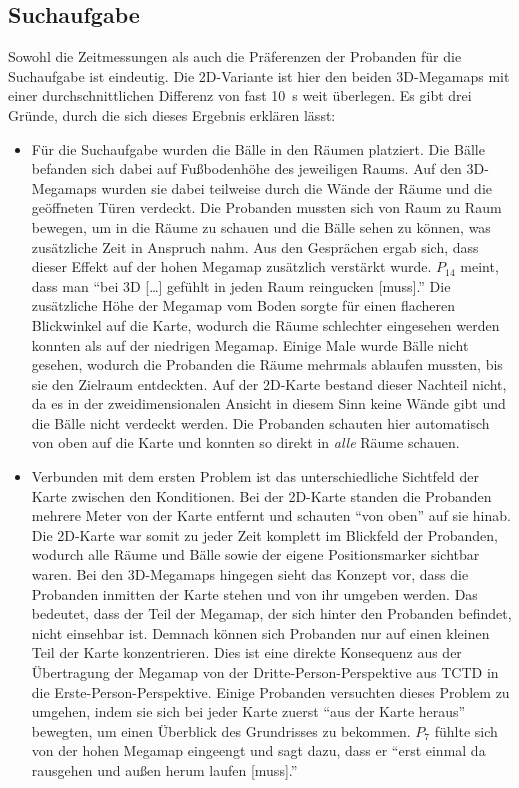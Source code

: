 \subsection{Suchaufgabe}
Sowohl die Zeitmessungen als auch die Präferenzen der Probanden für die Suchaufgabe ist eindeutig.
Die 2D-Variante ist hier den beiden 3D-Megamaps mit einer durchschnittlichen Differenz von fast \SI{10}{\second} weit überlegen.
Es gibt drei Gründe, durch die sich dieses Ergebnis erklären lässt:
\begin{itemize}
    \item
    Für die Suchaufgabe wurden die Bälle in den Räumen platziert.
    Die Bälle befanden sich dabei auf Fußbodenhöhe des jeweiligen Raums.
    Auf den 3D-Megamaps wurden sie dabei teilweise durch die Wände der Räume und die geöffneten Türen verdeckt.
    Die Probanden mussten sich von Raum zu Raum bewegen, um in die Räume zu schauen und die Bälle sehen zu können, was zusätzliche Zeit in Anspruch nahm.
    Aus den Gesprächen ergab sich, dass dieser Effekt auf der hohen Megamap zusätzlich verstärkt wurde.
    $P_{14}$ meint, dass man \enquote{bei 3D [\dots] gefühlt in jeden Raum reingucken [muss].}
    Die zusätzliche Höhe der Megamap vom Boden sorgte für einen flacheren Blickwinkel auf die Karte, wodurch die Räume schlechter eingesehen werden konnten als auf der niedrigen Megamap.
    Einige Male wurde Bälle nicht gesehen, wodurch die Probanden die Räume mehrmals ablaufen mussten, bis sie den Zielraum entdeckten.
    Auf der 2D-Karte bestand dieser Nachteil nicht, da es in der zweidimensionalen Ansicht in diesem Sinn keine Wände gibt und die Bälle nicht verdeckt werden.
    Die Probanden schauten hier automatisch von oben auf die Karte und konnten so direkt in \emph{alle} Räume schauen.
    
    \item
    Verbunden mit dem ersten Problem ist das unterschiedliche Sichtfeld der Karte zwischen den Konditionen.
    Bei der 2D-Karte standen die Probanden mehrere Meter von der Karte entfernt und schauten \enquote{von oben} auf sie hinab.
    Die 2D-Karte war somit zu jeder Zeit komplett im Blickfeld der Probanden, wodurch alle Räume und Bälle sowie der eigene Positionsmarker sichtbar waren.
    Bei den 3D-Megamaps hingegen sieht das Konzept vor, dass die Probanden inmitten der Karte stehen und von ihr umgeben werden.
    Das bedeutet, dass der Teil der Megamap, der sich hinter den Probanden befindet, nicht einsehbar ist.
    Demnach können sich Probanden nur auf einen kleinen Teil der Karte konzentrieren.
    Dies ist eine direkte Konsequenz aus der Übertragung der Megamap von der Dritte-Person-Perspektive aus TCTD in die Erste-Person-Perspektive.
    Einige Probanden versuchten dieses Problem zu umgehen, indem sie sich bei jeder Karte zuerst \enquote{aus der Karte heraus} bewegten, um einen Überblick des Grundrisses zu bekommen.
    $P_7$ fühlte sich von der hohen Megamap eingeengt und sagt dazu, dass er \enquote{erst einmal da rausgehen und außen herum laufen [muss].}
    

\end{itemize}
